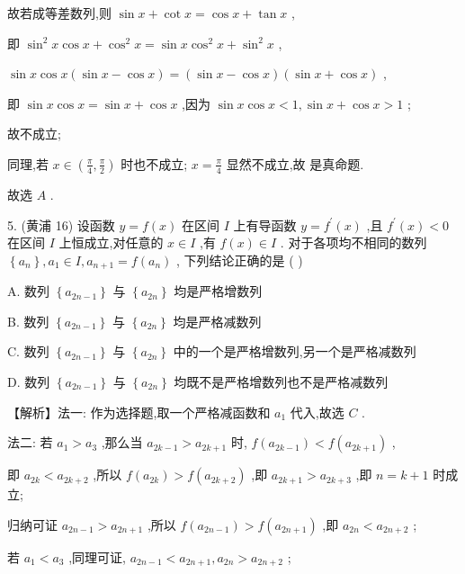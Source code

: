\documentclass[10pt]{article}
\newcommand*\circled[1]{\tikz[baseline=(char.base)]{\node[shape=circle,draw,inner sep=1.5pt] (char) {\small #1};}}
\begin{document}
故若成等差数列,则 \(\sin x + \cot x = \cos x + \tan x\) ,

即 \({\sin }^{2}x\cos x + {\cos }^{2}x = \sin x{\cos }^{2}x + {\sin }^{2}x\) ,

\(\sin x\cos x\left( {\sin x - \cos x}\right)  = \left( {\sin x - \cos x}\right) \left( {\sin x + \cos x}\right)\) ,

即 \(\sin x\cos x = \sin x + \cos x\) ,因为 \(\sin x\cos x < 1,\sin x + \cos x > 1\) ;

故不成立;

同理,若 \(x \in  \left( {\frac{\pi }{4},\frac{\pi }{2}}\right)\) 时也不成立; \(x = \frac{\pi }{4}\) 显然不成立,故 \circled{2} 是真命题.

故选 \(A\) .

5. (黄浦 16) 设函数 \(y = f\left( x\right)\) 在区间 \(I\) 上有导函数 \(y = {f}^{\prime }\left( x\right)\) ,且 \({f}^{\prime }\left( x\right)  < 0\) 在区间 \(I\) 上恒成立,对任意的 \(x \in  I\) ,有 \(f\left( x\right)  \in  I\) . 对于各项均不相同的数列 \(\left\{  {a}_{n}\right\}  ,{a}_{1} \in  I,{a}_{n + 1} = f\left( {a}_{n}\right)\) , 下列结论正确的是 ( )

A. 数列 \(\left\{  {a}_{{2n} - 1}\right\}\) 与 \(\left\{  {a}_{2n}\right\}\) 均是严格增数列

B. 数列 \(\left\{  {a}_{{2n} - 1}\right\}\) 与 \(\left\{  {a}_{2n}\right\}\) 均是严格减数列

C. 数列 \(\left\{  {a}_{{2n} - 1}\right\}\) 与 \(\left\{  {a}_{2n}\right\}\) 中的一个是严格增数列,另一个是严格减数列

D. 数列 \(\left\{  {a}_{{2n} - 1}\right\}\) 与 \(\left\{  {a}_{2n}\right\}\) 均既不是严格增数列也不是严格减数列

【解析】法一: 作为选择题,取一个严格减函数和 \({a}_{1}\) 代入,故选 \(C\) .

法二: 若 \({a}_{1} > {a}_{3}\) ,那么当 \({a}_{{2k} - 1} > {a}_{{2k} + 1}\) 时, \(f\left( {a}_{{2k} - 1}\right)  < f\left( {a}_{{2k} + 1}\right)\) ,

即 \({a}_{2k} < {a}_{{2k} + 2}\) ,所以 \(f\left( {a}_{2k}\right)  > f\left( {a}_{{2k} + 2}\right)\) ,即 \({a}_{{2k} + 1} > {a}_{{2k} + 3}\) ,即 \(n = k + 1\) 时成立;

归纳可证 \({a}_{{2n} - 1} > {a}_{{2n} + 1}\) ,所以 \(f\left( {a}_{{2n} - 1}\right)  > f\left( {a}_{{2n} + 1}\right)\) ,即 \({a}_{2n} < {a}_{{2n} + 2}\) ;

若 \({a}_{1} < {a}_{3}\) ,同理可证, \({a}_{{2n} - 1} < {a}_{{2n} + 1},{a}_{2n} > {a}_{{2n} + 2}\) ;
\end{document}
